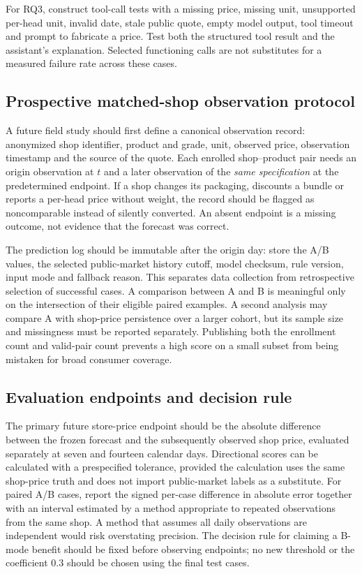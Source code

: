 \documentclass[conference]{IEEEtran}
\begin{document}
For RQ3, construct tool-call tests with a missing price, missing unit, unsupported per-head unit, invalid date, stale public quote, empty model output, tool timeout and prompt to fabricate a price. Test both the structured tool result and the assistant's explanation. Selected functioning calls are not substitutes for a measured failure rate across these cases.

\subsection{Prospective matched-shop observation protocol}
A future field study should first define a canonical observation record: anonymized shop identifier, product and grade, unit, observed price, observation timestamp and the source of the quote. Each enrolled shop--product pair needs an origin observation at $t$ and a later observation of the \emph{same specification} at the predetermined endpoint. If a shop changes its packaging, discounts a bundle or reports a per-head price without weight, the record should be flagged as noncomparable instead of silently converted. An absent endpoint is a missing outcome, not evidence that the forecast was correct.

The prediction log should be immutable after the origin day: store the A/B values, the selected public-market history cutoff, model checksum, rule version, input mode and fallback reason. This separates data collection from retrospective selection of successful cases. A comparison between A and B is meaningful only on the intersection of their eligible paired examples. A second analysis may compare A with shop-price persistence over a larger cohort, but its sample size and missingness must be reported separately. Publishing both the enrollment count and valid-pair count prevents a high score on a small subset from being mistaken for broad consumer coverage.

\subsection{Evaluation endpoints and decision rule}
The primary future store-price endpoint should be the absolute difference between the frozen forecast and the subsequently observed shop price, evaluated separately at seven and fourteen calendar days. Directional scores can be calculated with a prespecified tolerance, provided the calculation uses the same shop-price truth and does not import public-market labels as a substitute. For paired A/B cases, report the signed per-case difference in absolute error together with an interval estimated by a method appropriate to repeated observations from the same shop. A method that assumes all daily observations are independent would risk overstating precision. The decision rule for claiming a B-mode benefit should be fixed before observing endpoints; no new threshold or the coefficient $0.3$ should be chosen using the final test cases.
\end{document}
